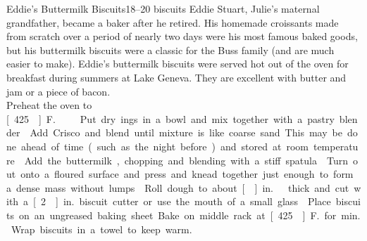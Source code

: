 \begin{recipe}{Eddie's Buttermilk Biscuits}{18--20 biscuits}{}
\freeform Eddie Stuart, Julie's maternal grandfather, became a baker after he retired. His homemade croissants made from scratch over a period of nearly two days were his most famous baked goods, but his buttermilk biscuits were a classic for the Buss family (and are much easier to make). Eddie's buttermilk biscuits were served hot out of the oven for breakfast during summers at Lake Geneva. They are excellent with butter and jam or a piece of bacon.\\
\vspace{1mm}
\newstep Preheat the oven to \unit[425\0]{F.}
Put dry ings in a bowl and mix together with a pastry blender.
Add Crisco and blend until mixture is like coarse sand.  This may be done ahead of time (such as the night before) and stored at room temperature.
Add the buttermilk, chopping and blending with a stiff spatula.
\newstep Turn out onto a floured surface and press and knead together just enough to form a dense mass without lumps.
\newstep Roll dough to about \unit[]{in.}\ thick and cut with a \unit[2]{in.} biscuit cutter or use the mouth of a small glass.
\newstep Place biscuits on an ungreased baking sheet. Bake on middle rack at \unit[425\0]{F.} for \unit[13]{min.} Wrap biscuits in a towel to keep warm.
\end{recipe}
